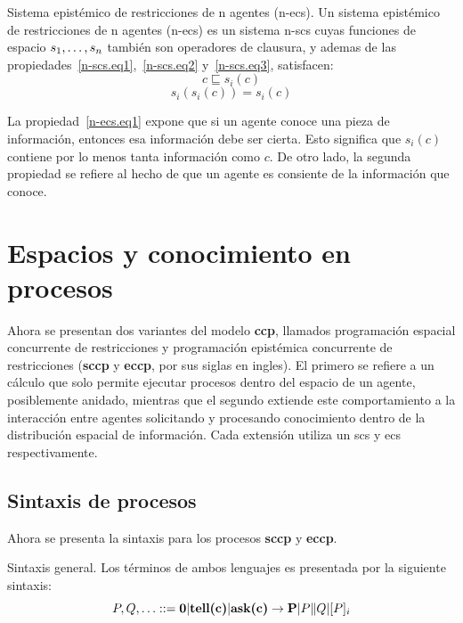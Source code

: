 \theoremstyle{definition}
\begin{definition}{Sistema epist\'emico de restricciones de n agentes (n-ecs).}
Un sistema epist\'emico de restricciones de n agentes (n-ecs) es un sistema n-scs cuyas funciones de espacio $s_1, \mathellipsis, s_n$ tambi\'en son operadores de clausura, y ademas de las propiedades~\ref{n-scs.eq1},~\ref{n-scs.eq2} y~\ref{n-scs.eq3}, satisfacen:
\begin{equation} \label{n-ecs.eq1}
c \sqsubseteq s_i(c)
\end{equation}
\begin{equation} \label{n-ecs.eq2}
s_i(s_i(c))=s_i(c)
\end{equation}
\end{definition}

La propiedad~\ref{n-ecs.eq1} expone que si un agente conoce una pieza de informaci\'on, entonces esa informaci\'on debe ser cierta. Esto significa que $s_i(c)$ contiene por lo menos tanta informaci\'on como $c$. De otro lado, la segunda propiedad se refiere al hecho de que un agente es consiente de la informaci\'on que conoce. 

\section{Espacios y conocimiento en procesos}
\label{ecp.sccp}

Ahora se presentan dos variantes del modelo \textbf{ccp}, llamados programaci\'on espacial concurrente de restricciones y programaci\'on epist\'emica concurrente de restricciones (\textbf{sccp} y \textbf{eccp}, por sus siglas en ingles). El primero se refiere a un c\'alculo que solo permite ejecutar procesos dentro del espacio de un agente, posiblemente anidado, mientras que el segundo extiende este comportamiento a la interacci\'on entre agentes solicitando y procesando conocimiento dentro de la distribuci\'on espacial de informaci\'on. Cada extensi\'on utiliza un scs y ecs respectivamente.

\subsection{Sintaxis de procesos}
\label{spr.cap3}

Ahora se presenta la sintaxis para los procesos \textbf{sccp} y \textbf{eccp}.

\theoremstyle{definition}
\begin{definition}{Sintaxis general.}
Los t\'erminos de ambos lenguajes es presentada por la siguiente sintaxis:
\[P,Q, \mathellipsis ::=\textbf{0} | \textbf{tell(c)} | \textbf{ask(c)} \rightarrow \textbf{P} | P\|Q | [P]_i\]
\end{definition}

